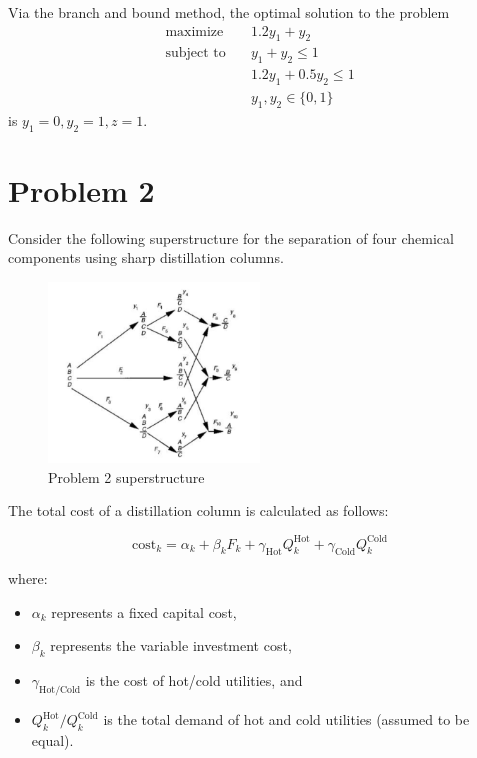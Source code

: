 \documentclass[11pt]{article}
\begin{document}
Via the branch and bound method, the optimal solution to the problem
\begin{align*}
  \text{maximize} & \quad 1.2y_1 + y_2 \\
  \text{subject to} & \quad y_1 + y_2 \leq 1 \\
  & \quad 1.2y_1 + 0.5y_2 \leq 1 \\
  & \quad y_1, y_2 \in \{ 0,1 \}
\end{align*}
is $y_1=0,y_2=1,z=1$.

\clearpage
\section{Problem 2}
\label{prob2}

Consider the following superstructure for the separation of four chemical components using sharp distillation columns. 
\begin{figure}[htbp]
  \centerline{\includegraphics[width=0.50\textwidth]{images/prob2_superstructure.png}}
  \caption{Problem 2 superstructure}
  \label{fig:prob2_superstructure}
\end{figure}
The total cost of a distillation column is calculated as follows:

\[
\text{cost}_k = \alpha_k + \beta_k F_k + \gamma_\text{Hot} Q_k^\text{Hot} + \gamma_\text{Cold} Q_k^\text{Cold}
\]

where:
\begin{itemize}
  \item $\alpha_k$ represents a fixed capital cost,
  \item $\beta_k$ represents the variable investment cost,
  \item $\gamma_{\text{Hot}/\text{Cold}}$ is the cost of hot/cold utilities, and
  \item $Q_k^\text{Hot}/Q_k^\text{Cold}$ is the total demand of hot and cold utilities (assumed to be equal).
\end{itemize}
\end{document}
